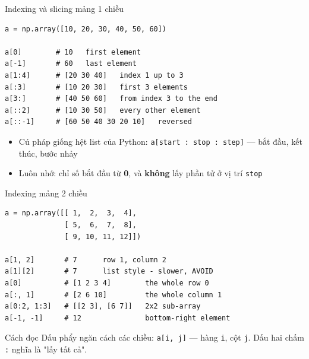 \documentclass[11pt]{beamer}
\begin{document}
\begin{frame}[fragile]{Indexing và slicing mảng 1 chiều}
\begin{lstlisting}
a = np.array([10, 20, 30, 40, 50, 60])

a[0]        # 10   first element
a[-1]       # 60   last element
a[1:4]      # [20 30 40]   index 1 up to 3
a[:3]       # [10 20 30]   first 3 elements
a[3:]       # [40 50 60]   from index 3 to the end
a[::2]      # [10 30 50]   every other element
a[::-1]     # [60 50 40 30 20 10]   reversed
\end{lstlisting}
\begin{itemize}
  \item Cú pháp giống hệt list của Python: \texttt{a[start : stop : step]} --- bắt đầu, kết thúc, bước nhảy
  \item Luôn nhớ: chỉ số bắt đầu từ \textbf{0}, và \textbf{không} lấy phần tử ở vị trí \texttt{stop}
\end{itemize}
\end{frame}

\begin{frame}[fragile]{Indexing mảng 2 chiều}
\begin{lstlisting}
a = np.array([[ 1,  2,  3,  4],
              [ 5,  6,  7,  8],
              [ 9, 10, 11, 12]])

a[1, 2]       # 7      row 1, column 2
a[1][2]       # 7      list style - slower, AVOID
a[0]          # [1 2 3 4]        the whole row 0
a[:, 1]       # [2 6 10]         the whole column 1
a[0:2, 1:3]   # [[2 3], [6 7]]   2x2 sub-array
a[-1, -1]     # 12               bottom-right element
\end{lstlisting}
\begin{block}{Cách đọc}
Dấu phẩy ngăn cách các chiều: \texttt{a[i, j]} --- hàng \texttt{i}, cột \texttt{j}. Dấu hai chấm \texttt{:} nghĩa là "lấy tất cả".
\end{block}
\end{frame}
\end{document}
